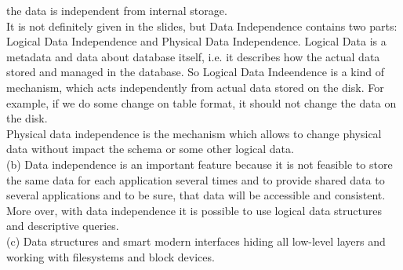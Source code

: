 \documentclass[10pt]{article}
\begin{document}
  the data is independent from internal storage.\\
  It is not definitely given in the slides, but Data Independence contains
  two parts: Logical Data Independence and Physical Data Independence. Logical Data
  is a metadata and data about database itself, i.e. it describes how the actual
  data stored and managed in the database. So Logical Data Indeendence is a kind of
  mechanism, which acts independently from actual data stored on the disk. For example,
  if we do some change on table format, it should not change the data on the disk.\\
  Physical data independence is the mechanism which allows to change physical data
  without impact the schema or some other logical data.\\
  (b) Data independence is an important feature because it is not feasible to store
  the same data for each application several times and to provide shared data to
  several applications and to be sure, that data will be accessible and consistent.
  More over, with data independence it is possible to use logical data structures
  and descriptive queries.\\
  (c) Data structures and smart modern interfaces hiding all low-level layers and working
  with filesystems and block devices.
\end{document}
